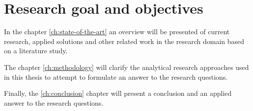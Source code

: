
\section{Research goal and objectives}
\label{sec:research-goal-and-objectives}


\clearpage{}

In the chapter \ref{ch:state-of-the-art} an overview will be presented of current research, applied solutions and other related work in the research domain based on a literature study.

The chapter \ref{ch:methodology} will clarify the analytical research approaches used in this thesis to attempt to formulate an answer to the research questions.

Finally, the \ref{ch:conclusion} chapter will present a conclusion and an applied answer to the research questions.
